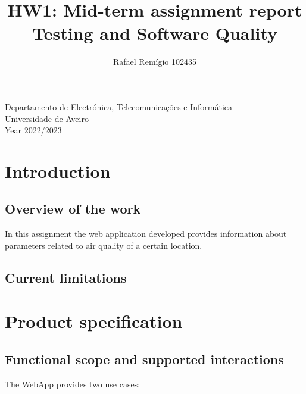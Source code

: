 \documentclass[12pt]{article}
\begin{document}
\begin{titlepage}

\title{%
  HW1: Mid-term assignment report\\
  \large  Testing and Software Quality\\}

\author{Rafael Remígio 102435}

\maketitle

\vfill
\begin{center}

	Departamento de Electrónica, Telecomunicações e Informática\\
       Universidade de Aveiro\\ Year 2022/2023
\end{center}



\end{titlepage}

\tableofcontents


\section{Introduction}

\subsection{Overview of the work} 

In this assignment the web application developed provides information about parameters related to air quality of a certain location.

\subsection{Current limitations} 


\section{Product specification}


\subsection{Functional scope and supported interactions }

The WebApp provides two use cases:
\end{document}
